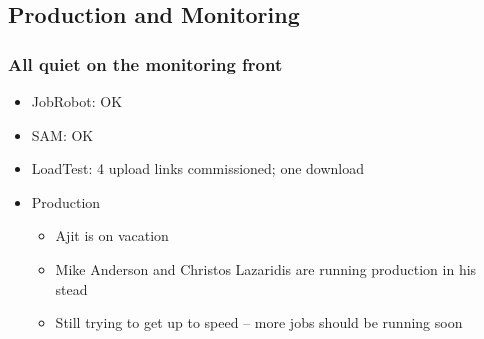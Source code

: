 \documentclass{beamer}
\begin{document}
\subsection{Production and Monitoring}
\begin{frame}
\frametitle{All quiet on the monitoring front}
\begin{itemize}
    \item JobRobot: OK
    \item SAM: OK
    \item LoadTest: 4 upload links commissioned; one download
    \item Production
    \begin{itemize}
        \item Ajit is on vacation
        \item Mike Anderson and Christos Lazaridis are running production in his stead
        \item Still trying to get up to speed -- more jobs should be running soon
    \end{itemize}
\end{itemize}
\end{frame}
\end{document}
